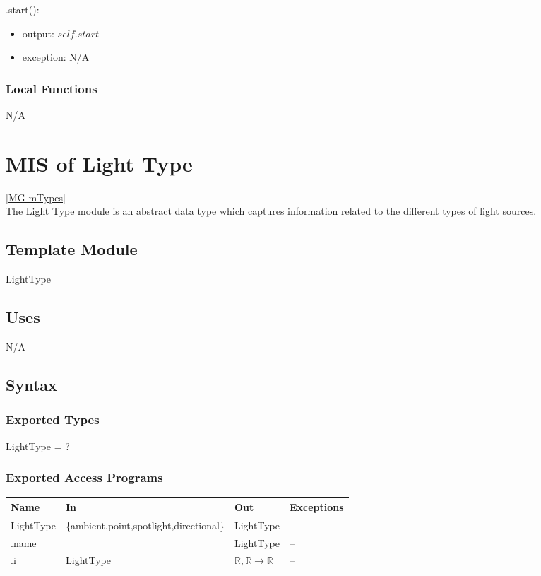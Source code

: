 \documentclass[12pt, titlepage]{article}
\begin{document}
\noindent .start():
\begin{itemize}
	\item output: $self.start$
	\item exception: N/A
\end{itemize}


\subsubsection{Local Functions}
N/A

\newpage

\section{MIS of Light Type} \ref{MG-mTypes} \\
The Light Type module is an abstract data type which captures information 
related to the different types of light sources.

\subsection{Template Module}
LightType

\subsection{Uses}
N/A

\subsection{Syntax}
\subsubsection{Exported Types}
LightType = ?
\subsubsection{Exported Access Programs}
\begin{center}
	\begin{tabular}{p{2cm} p{7cm} p{2cm} p{4cm}}
		\hline
		\textbf{Name} & \textbf{In} & \textbf{Out} & \textbf{Exceptions} \\
		\hline
		LightType & \{ambient,point,spotlight,directional\} & LightType & -- \\
		.name & & LightType & -- \\
		.i & LightType & $\mathbb{R},\mathbb{R} \to 
		\mathbb{R}$ & -- \\
		\hline
	\end{tabular}
\end{center}
\end{document}
